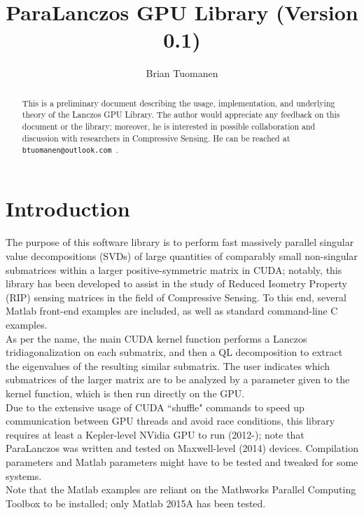 \documentclass{amsart}
\title{ParaLanczos GPU Library (Version 0.1)}
\author[Tuomanen]{Brian Tuomanen}
\begin{document}
\maketitle

\begin{abstract}
This is a preliminary document describing the usage, implementation, and underlying theory of the  Lanczos GPU Library.  The author would appreciate any feedback on this document or the library;  moreover, he is interested in possible collaboration and discussion with researchers in Compressive Sensing.  He can be reached at {\tt btuomanen@outlook.com }.
\end{abstract}


\section{Introduction}



The purpose of this software library is to perform fast massively parallel singular value decompositions (SVDs) of large quantities of comparably small non-singular submatrices within a larger positive-symmetric matrix in CUDA;  notably, this library has been developed to assist in the study of Reduced Isometry Property (RIP) sensing matrices in the field of Compressive Sensing.  To this end, several Matlab front-end examples are included, as well as standard command-line C examples.\\

As per the name, the main CUDA kernel function performs a Lanczos tridiagonalization on each submatrix, and then a QL decomposition to extract the eigenvalues of the resulting similar submatrix.  The user indicates which submatrices of the larger matrix are to be analyzed by a parameter given to the kernel function, which is then run directly on the GPU.\\ 

Due to the extensive usage of CUDA ``shuffle" commands to speed up communication between GPU threads and avoid race conditions, this library requires at least a Kepler-level NVidia GPU to run (2012-);  note that ParaLanczos was written and tested on Maxwell-level (2014) devices.  Compilation  parameters and Matlab parameters might have to be tested and tweaked for some systems.\\

Note that the Matlab examples are reliant on the Mathworks Parallel Computing Toolbox to be installed;  only Matlab 2015A has been tested.\\ 
\end{document}
